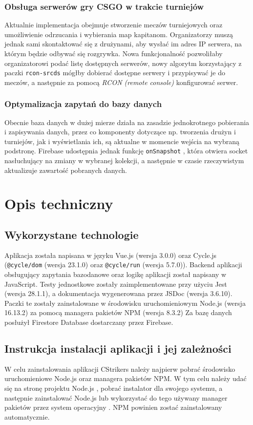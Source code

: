 \documentclass[shortabstract]{iithesis}
\theoremstyle{definition} \newtheorem{definition}{Definicja}[]
\theoremstyle{remark} \newtheorem{remark}[definition]{Observation}
\theoremstyle{plain} \newtheorem{theorem}[definition]{Theorem}
\theoremstyle{plain} \newtheorem{lemma}[definition]{Lemma}
\begin{document}
\subsection{Obsługa serwerów gry CSGO w trakcie turniejów}
Aktualnie implementacja obejmuje stworzenie meczów turniejowych oraz umożliwienie odrzucania i wybierania map kapitanom. Organizatorzy muszą jednak sami skontaktować się z drużynami, aby wysłać im adres IP serwera, na którym będzie odbywać się rozgrywka. Nowa funkcjonalność pozwoliłaby organizatorowi podać listę dostępnych serwerów, nowy algorytm korzystający z paczki \texttt{rcon-srcds} \cite{bib:rcon-lib} mógłby dobierać dostępne serwery i przypisywać je do meczów, a następnie za pomocą \textit{RCON (remote console)} konfigurować serwer.

\subsection{Optymalizacja zapytań do bazy danych}
Obecnie baza danych w dużej mierze działa na zasadzie jednokrotnego pobierania i zapisywania danych, przez co komponenty dotyczące np. tworzenia drużyn i turniejów, jak i wyświetlania ich, są aktualne w momencie wejścia na wybraną podstronę. Firebase udostępnia jednak funkcję \texttt{onSnapshot} \cite{bib:firebase-on-snapshot}, która otwiera socket nasłuchujący na zmiany w wybranej kolekcji, a następnie w czasie rzeczywistym aktualizuje zawartość pobranych danych.

\chapter{Opis techniczny}
\section{Wykorzystane technologie}
Aplikacja została napisana w języku Vue.js (wersja 3.0.0) oraz Cycle.js (\texttt{@cycle/dom} (wersja 23.1.0) oraz \texttt{@cycle/run} (wersja 5.7.0)). Backend aplikacji obsługujący zapytania bazodanowe oraz logikę aplikacji został napisany w JavaScript. Testy jednostkowe zostały zaimplementowane przy użyciu Jest (wersja 28.1.1), a dokumentacja wygenerowana przez JSDoc (wersja 3.6.10). Paczki te zostały zainstalowane w środowisku uruchomieniowym Node.js (wersja 16.13.2) za pomocą managera pakietów NPM (wersja 8.3.2) Za bazę danych posłużył Firestore Database dostarczany przez Firebase.

\section{Instrukcja instalacji aplikacji i jej zależności}
W celu zainstalowania aplikacji CStrikers należy najpierw pobrać środowisko uruchomieniowe Node.js oraz managera pakietów NPM. W tym celu należy udać się na stronę projektu Node.js \cite{bib:nodejs-downloads}, pobrać instalator dla swojego systemu, a następnie zainstalować Node.js lub wykorzystać do tego używany manager pakietów przez system operacyjny \cite{bib:nodejs-package-manager}. NPM powinien zostać zainstalowany automatycznie.
\end{document}
